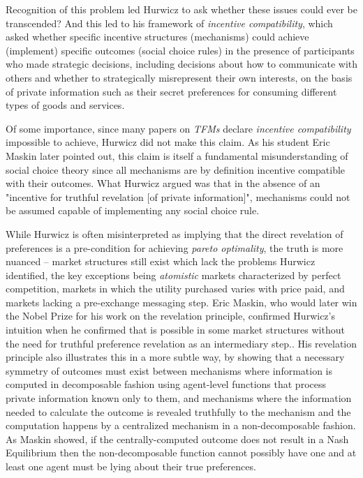 \documentclass[sigconf,anonymous]{aamas}
\begin{document}
Recognition of this problem led Hurwicz to ask whether these issues could ever be transcended? And this led to his framework of \textit{incentive compatibility}, which asked whether specific incentive structures (mechanisms) could achieve (implement) specific outcomes (social choice rules) in the presence of participants who made strategic decisions, including decisions about how to communicate with others and whether to strategically misrepresent their own interests, on the basis of private information such as their secret preferences for consuming different types of goods and services.

Of some importance, since many papers on \textit{TFMs} declare \textit{incentive compatibility} impossible to achieve, Hurwicz did not make this claim. As his student Eric Maskin later pointed out, this claim is itself a fundamental misunderstanding of social choice theory since all mechanisms are by definition incentive compatible with their outcomes. What Hurwicz argued was that in the absence of an "incentive for truthful revelation [of private information]", mechanisms could not be assumed capable of implementing any social choice rule.

While Hurwicz is often misinterpreted as implying that the direct revelation of preferences is a pre-condition for achieving \textit{pareto optimality}, the truth is more nuanced -- market structures still exist which lack the problems Hurwicz identified, the key exceptions being \textit{atomistic} markets characterized by perfect competition, markets in which the utility purchased varies with price paid, and markets lacking a pre-exchange messaging step. Eric Maskin, who would later win the Nobel Prize for his work on the revelation principle, confirmed Hurwicz's intuition when he confirmed that  is possible in some market structures without the need for truthful preference revelation as an intermediary step.\citet{maskin1999nash}. His revelation principle also illustrates this in a more subtle way, by showing that a necessary symmetry of outcomes must exist between mechanisms where information is computed in decomposable fashion using agent-level functions that process private information known only to them, and mechanisms where the information needed to calculate the outcome is revealed truthfully to the mechanism and the computation happens by a centralized mechanism in a non-decomposable fashion. As Maskin showed, if the centrally-computed outcome does not result in a Nash Equilibrium then the non-decomposable function cannot possibly have one and at least one agent must be lying about their true preferences.
\end{document}
